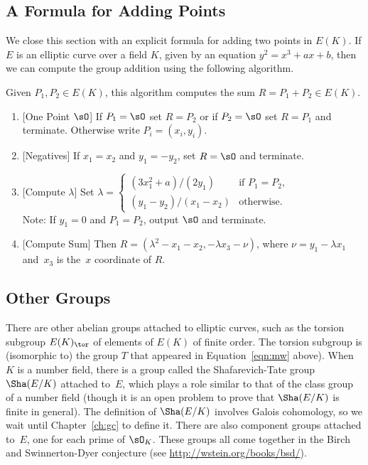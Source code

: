 \subsection{A Formula for Adding Points}

We close this section with an explicit formula for adding two points in $E(K)$.
If $E$ is an elliptic curve over a field $K$, given by an
equation $y^2=x^3+ax+b$, then we can compute the group addition using the
following algorithm.
\begin{algorithm}\label{alg:grouplaw}
  Given $P_1, P_2\in E(K)$,
  this algorithm computes the sum $R=P_1+P_2 \in E(K)$.
  \begin{enumerate}
    \item{}[One Point $\sO$] If $P_1=\sO$ set $R=P_2$ or if $P_2=\sO$ set $R=P_1$
    and terminate.  Otherwise write $P_i=(x_i,y_i)$.
    \item{}[Negatives]  If $x_1 = x_2$ and $y_1 = -y_2$, set $R=\sO$ and terminate.
    \item{}[Compute $\lambda$]\label{alg:grouplaw_3}
    Set $\displaystyle \lambda = \begin{cases}
    (3x_1^2+a)/(2y_1) & \text{if }P_1 = P_2,\\
    (y_1-y_2)/(x_1-x_2) & \text{otherwise.}
    \end{cases}$\\
    Note: If $y_1=0$ and $P_1=P_2$, output $\sO$ and terminate.
    \item{}[Compute Sum]\label{alg:grouplaw_4}  Then
    $R = \displaystyle \left(\lambda^2 -x_1 - x_2, -\lambda x_3 - \nu\right)$,
    where $\nu = y_1 - \lambda x_1$ and~$x_3$ is the~$x$ coordinate of $R$.
  \end{enumerate}
\end{algorithm}

\subsection{Other Groups}

There are other abelian groups attached to elliptic curves, such as
the torsion subgroup $E(K)_{\tor}$ of elements of $E(K)$ of finite
order.  The torsion subgroup is (isomorphic to) the group $T$ that
appeared in Equation~\eqref{eqn:mw} above).  When $K$ is a number
field, there is a group called the Shafarevich-Tate group $\Sha(E/K)$
attached to~$E$, which plays a role similar to that of the class group
of a number field (though it is an open problem to prove that
$\Sha(E/K)$ is finite in general).  The  definition of $\Sha(E/K)$ involves Galois
cohomology, so we wait until Chapter~\ref{ch:gc} to define it.  There
are also component groups attached to~$E$, one for each prime of
$\sO_K$.  These groups all come together in the Birch and
Swinnerton-Dyer conjecture (see \url{http://wstein.org/books/bsd/}).

